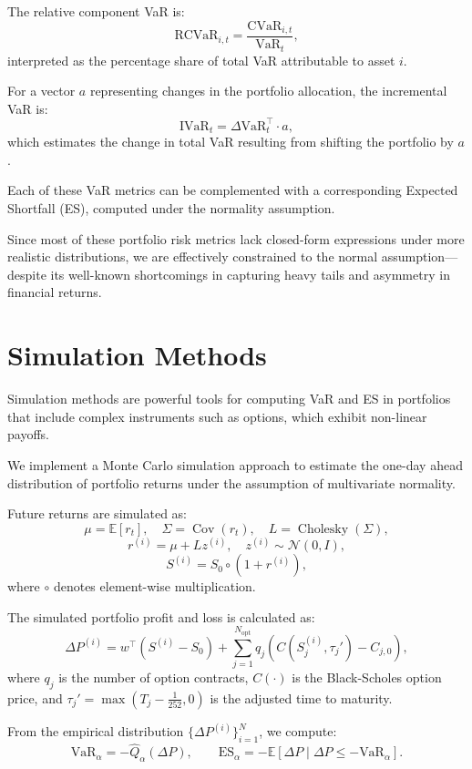 \documentclass[12pt]{article}
\begin{document}
The relative component VaR is:
\[
  \text{RCVaR}_{i,t} = \frac{\text{CVaR}_{i,t}}{\text{VaR}_t},
\]
interpreted as the percentage share of total VaR attributable to asset \( i \).

For a vector \( a \) representing changes in the portfolio allocation, the incremental VaR is:
\[
  \text{IVaR}_t = \Delta \text{VaR}_t^\top \cdot a,
\]
which estimates the change in total VaR resulting from shifting the portfolio by \( a \).

Each of these VaR metrics can be complemented with a corresponding Expected Shortfall (ES), computed under the normality assumption.

Since most of these portfolio risk metrics lack closed-form expressions under more realistic distributions, we are effectively constrained to the normal assumption—despite its well-known shortcomings in capturing heavy tails and asymmetry in financial returns.


\section{Simulation Methods}

Simulation methods are powerful tools for computing VaR and ES in portfolios that include complex instruments such as options, which exhibit non-linear payoffs.

We implement a Monte Carlo simulation approach to estimate the one-day ahead distribution of portfolio returns under the assumption of multivariate normality. 

Future returns are simulated as:
\[
\mu = \mathbb{E}[r_t], \quad \Sigma = \operatorname{Cov}(r_t), \quad L = \operatorname{Cholesky}(\Sigma),
\]
\[
r^{(i)} = \mu + L z^{(i)}, \quad z^{(i)} \sim \mathcal{N}(0, I),
\]
\[
S^{(i)} = S_0 \circ (1 + r^{(i)}),
\]
where \( \circ \) denotes element-wise multiplication.

The simulated portfolio profit and loss is calculated as:
\[
\Delta P^{(i)} = w^\top(S^{(i)} - S_0) + \sum_{j=1}^{N_{\mathrm{opt}}} q_j \left(C(S_j^{(i)}, \tau_j') - C_{j,0}\right),
\]
where \( q_j \) is the number of option contracts, \( C(\cdot) \) is the Black-Scholes option price, and \( \tau_j' = \max(T_j - \tfrac{1}{252}, 0) \) is the adjusted time to maturity.

From the empirical distribution \( \{\Delta P^{(i)}\}_{i=1}^N \), we compute:
\[
\text{VaR}_\alpha = -\widehat{Q}_\alpha(\Delta P), \qquad
\text{ES}_\alpha = -\mathbb{E}[\Delta P \mid \Delta P \le -\text{VaR}_\alpha].
\]
\end{document}
